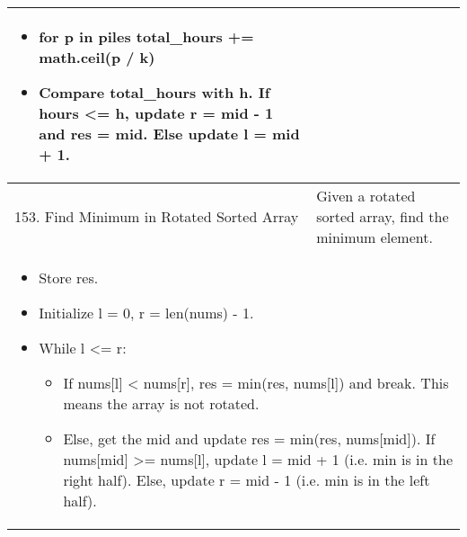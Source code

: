 \begin{summary}
\begin{center}
\begin{tabular}{ll}
{\begin{itemize}
                    \begin{itemize}
                        \item for p in piles total\_hours += math.ceil(p / k)
                        \item Compare total\_hours with h. If hours <= h, update r = mid - 1 and res = mid. Else update l = mid + 1.
                    \end{itemize}
                \end{itemize}
            } \\
            \midrule 
            153. Find Minimum in Rotated Sorted Array & Given a rotated sorted array, find the minimum element. \\
            \multicolumn{2}{p{\linewidth}}{
                \begin{itemize}
                    \item Store res. 
                    \item Initialize l = 0, r = len(nums) - 1.
                    \item While l <= r:
                    \begin{itemize}
                        \item If nums[l] < nums[r], res = min(res, nums[l]) and break. This means the array is not rotated.
                        \item Else, get the mid and update res = min(res, nums[mid]). If nums[mid] >= nums[l], update l = mid + 1 (i.e. min is in the right half). Else, update r = mid - 1 (i.e. min is in the left half).
                    \end{itemize}
                \end{itemize}
            } \\
            \midrule
            \bottomrule
        \end{tabular}
    \end{center}
\end{summary}

